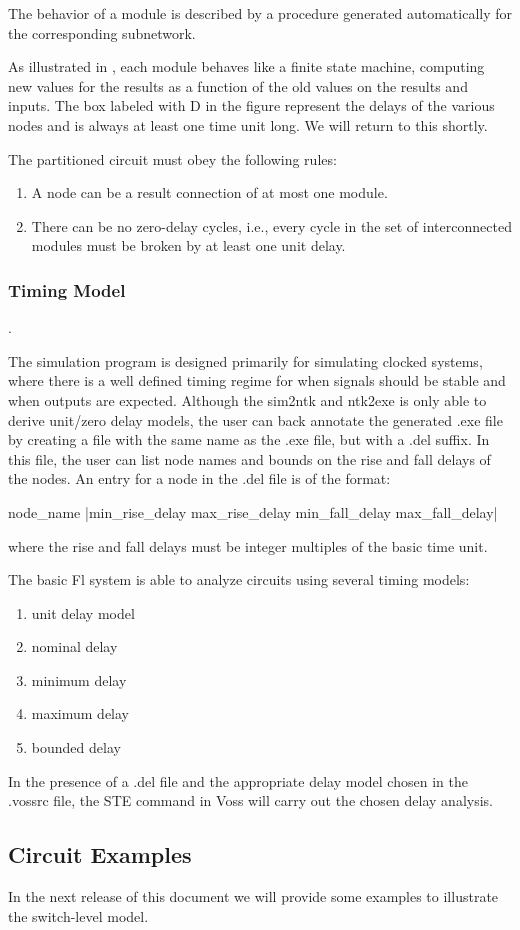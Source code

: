 The behavior of a module is described by a procedure generated
automatically for the corresponding subnetwork.

As illustrated in , each module behaves like
a finite state machine, computing new values for the results as a function
of the old values on the results and inputs.
The box labeled with D in the figure represent the delays of the
various nodes and is always at least one time unit long.
We will return to this shortly.

The partitioned circuit must obey the following rules:
\begin{enumerate}
\item
A node can be a result connection of at most one module.
\item
There can be no zero-delay cycles, i.e., every cycle in the set
of interconnected modules must be broken by at least one unit delay.
\end{enumerate}

\subsubsection{Timing Model}
\label{TimingModel}.

\label{DelayAnnotation}
The simulation program is designed primarily for simulating clocked
systems, where there is a well defined timing regime for when signals
should be stable and when outputs are expected.
Although the sim2ntk and ntk2exe is only able to derive unit/zero
delay models, the user can back annotate the generated .exe file
by creating a file with the same name as the .exe file, but with a
.del suffix.
In this file, the user can list node names and bounds on the rise
and fall delays of the nodes.
An entry for a node in the .del file is of the format:
\begin{hol}
node\_name |min\_rise\_delay max\_rise\_delay min\_fall\_delay max\_fall\_delay|
\end{hol}
where the rise and fall delays must be integer multiples of the basic time unit.

The basic Fl system is able to analyze circuits using several timing models:
\begin{enumerate}
\item
unit delay model
\item
nominal delay
\item
minimum delay
\item
maximum delay
\item
bounded delay
\end{enumerate}

In the presence of a .del file and the appropriate delay model chosen
in the .vossrc file, the STE command in Voss will carry out the
chosen delay analysis.

\subsection{Circuit Examples}

In the next release of this document we will provide some
examples to illustrate the switch-level model.
